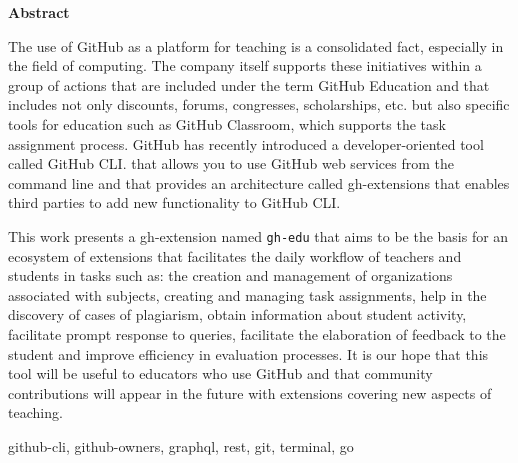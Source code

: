 \documentclass[spanish,a4paper,12pt,oneside]{extreport}
\newenvironment{summary}
{\par\noindent\begin{center}\textbf{Abstract}\end{center}\begin{itshape}\par\noindent}
{\end{itshape}}
\newenvironment{keywords}
{\begin{list}{}{\setlength{\leftmargin}{1em}}\item[\hskip\labelsep \bfseries Keywords:]}
{\end{list}}
\begin{document}
\begin{summary} %
  The use of GitHub as a platform for teaching is a consolidated fact, especially in the field of
  computing.
  The company itself supports these initiatives within a group of actions that are included
  under the term GitHub Education and that includes not only discounts,
  forums, congresses, scholarships, etc. but also specific tools for education such as GitHub Classroom,
  which supports the task assignment process.
  GitHub has recently introduced a developer-oriented tool called GitHub CLI.
  that allows you to use GitHub web services from the command line and that
  provides an architecture called gh-extensions
  that enables third parties to add new functionality to GitHub CLI.
  
  This work presents a gh-extension named \verb|gh-edu|
  that aims to be the basis for an ecosystem of extensions that
  facilitates the daily workflow of teachers and students
  in tasks such as: the creation and management of organizations associated with subjects,
  creating and managing task assignments,
  help in the discovery of cases of plagiarism,
  obtain information about student activity,
  facilitate prompt response to queries,
  facilitate the elaboration of feedback to the student and
  improve efficiency in evaluation processes.
  It is our hope that this tool will be useful to educators who use GitHub and that
  community contributions will appear in the future with extensions covering new aspects of teaching.
\begin {keywords}
github-cli, github-owners, graphql, rest, git, terminal, go
\end {keywords}

\end{summary}
\newpage{\pagestyle{empty}}
\thispagestyle{empty}

\pagestyle{myheadings} %



\renewcommand{\thepage}{\roman{page}}
\setcounter{page}{1}
\pagestyle{plain} 
\end{document}
